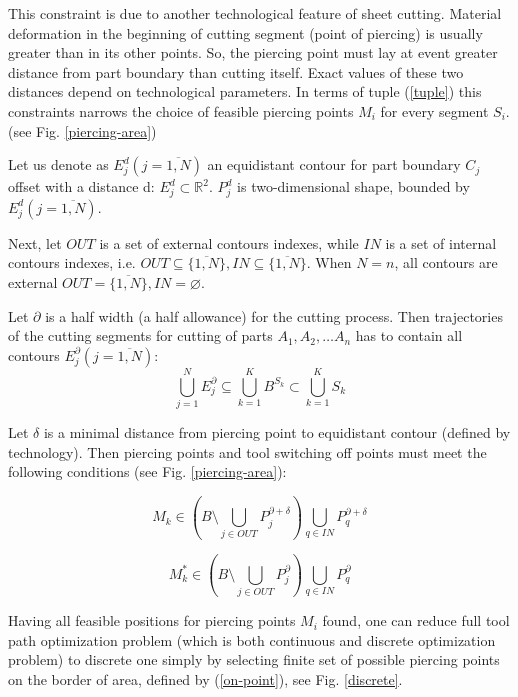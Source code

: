 \documentclass{../download/tPRS2e}
\begin{document}
This constraint is due to another technological feature of sheet cutting.
Material deformation in the beginning of cutting segment (point of piercing) is usually greater than in its other points.
So, the piercing point must lay at event greater distance from part boundary than cutting itself.
Exact values of these two distances depend on technological parameters.
In terms of tuple (\ref{tuple}) this constraints narrows the choice of feasible piercing points $M_i$
for every segment $S_i$. (see Fig. \ref{piercing-area})

Let us denote as $E^d_j (j = \overline{1, N})$
an equidistant contour for part boundary $C_j$
offset with a distance d:
$E^d_j \subset \mathbb{R}^2$.
$P^d_j$ is two-dimensional shape, bounded by $E^d_j (j=\overline{1, N})$.

Next, let $OUT$ is a set of external contours indexes,
while $IN$ is a set of internal contours indexes,
i.e. $OUT \subseteq \{\overline{1, N}\},  IN \subseteq \{\overline{1, N}\}$.
When $N = n$, all contours are external $OUT=\{\overline{1, N}\}, IN = \varnothing$.

Let $\partial$  is a half width (a half allowance) for the cutting process.
Then trajectories of the cutting segments for cutting of parts $A_1, A_2, \dots A_n$ has to contain all contours  $E^\partial_j (j = \overline{1, N})$:
$$
\bigcup^N_{j=1} E^\partial_j
\subseteq
\bigcup^K_{k=1} B^{S_k}
\subset
\bigcup^K_{k=1} S_k
$$

Let $\delta$  is a minimal distance from piercing point to equidistant contour (defined by technology).
Then piercing points and tool switching off points must meet the following conditions (see Fig. \ref{piercing-area}):

\begin{equation} \label{on-point}
M_k \in
( B \setminus \bigcup_{j \in OUT} P^{\partial + \delta}_j ) \bigcup_{q \in IN} P^{\partial + \delta}_q
\end{equation}

\begin{equation} \label{off-point}
M_k^* \in
( B \setminus \bigcup_{j \in OUT} P^\partial_j ) \bigcup_{q \in IN} P^\partial_q
\end{equation}

Having all feasible positions for piercing points $M_i$ found,
one can reduce full tool path optimization problem
(which is both continuous and discrete optimization problem)
to discrete one simply by selecting finite set of possible piercing points on the border of area,
defined by (\ref{on-point}), see Fig. \ref{discrete}.
\end{document}
